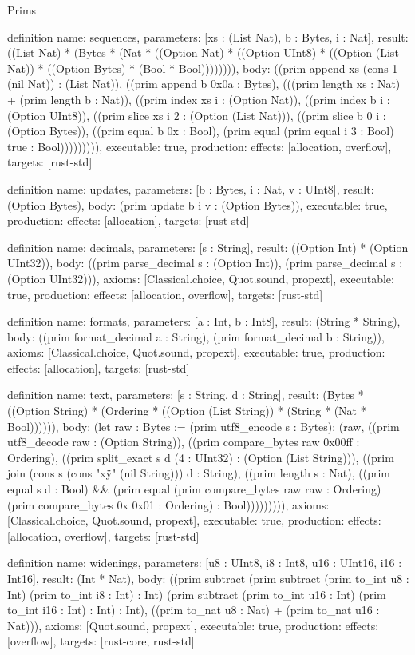 \begin{lexlean}{Prims}
\begin{semanticmodule}
definition{
  name: sequences,
  parameters: [xs : (List Nat), b : Bytes, i : Nat],
  result: ((List Nat) * (Bytes * (Nat * ((Option Nat) * ((Option UInt8) * ((Option (List Nat)) * ((Option Bytes) * (Bool * Bool)))))))),
  body: ((prim append xs (cons 1 (nil Nat)) : (List Nat)), ((prim append b 0x0a : Bytes), (((prim length xs : Nat) + (prim length b : Nat)), ((prim index xs i : (Option Nat)), ((prim index b i : (Option UInt8)), ((prim slice xs i 2 : (Option (List Nat))), ((prim slice b 0 i : (Option Bytes)), ((prim equal b 0x : Bool), (prim equal (prim equal i 3 : Bool) true : Bool))))))))),
  executable: true,
  production: {effects: [allocation, overflow], targets: [rust-std]}
}

definition{
  name: updates,
  parameters: [b : Bytes, i : Nat, v : UInt8],
  result: (Option Bytes),
  body: (prim update b i v : (Option Bytes)),
  executable: true,
  production: {effects: [allocation], targets: [rust-std]}
}

definition{
  name: decimals,
  parameters: [s : String],
  result: ((Option Int) * (Option UInt32)),
  body: ((prim parse_decimal s : (Option Int)), (prim parse_decimal s : (Option UInt32))),
  axioms: [Classical.choice, Quot.sound, propext],
  executable: true,
  production: {effects: [allocation, overflow], targets: [rust-std]}
}

definition{
  name: formats,
  parameters: [a : Int, b : Int8],
  result: (String * String),
  body: ((prim format_decimal a : String), (prim format_decimal b : String)),
  axioms: [Classical.choice, Quot.sound, propext],
  executable: true,
  production: {effects: [allocation], targets: [rust-std]}
}

definition{
  name: text,
  parameters: [s : String, d : String],
  result: (Bytes * ((Option String) * (Ordering * ((Option (List String)) * (String * (Nat * Bool)))))),
  body: (let raw : Bytes := (prim utf8_encode s : Bytes); (raw, ((prim utf8_decode raw : (Option String)), ((prim compare_bytes raw 0x00ff : Ordering), ((prim split_exact s d (4 : UInt32) : (Option (List String))), ((prim join (cons s (cons "x\"y" (nil String))) d : String), ((prim length s : Nat), ((prim equal s d : Bool) && (prim equal (prim compare_bytes raw raw : Ordering) (prim compare_bytes 0x 0x01 : Ordering) : Bool))))))))),
  axioms: [Classical.choice, Quot.sound, propext],
  executable: true,
  production: {effects: [allocation, overflow], targets: [rust-std]}
}

definition{
  name: widenings,
  parameters: [u8 : UInt8, i8 : Int8, u16 : UInt16, i16 : Int16],
  result: (Int * Nat),
  body: ((prim subtract (prim subtract (prim to_int u8 : Int) (prim to_int i8 : Int) : Int) (prim subtract (prim to_int u16 : Int) (prim to_int i16 : Int) : Int) : Int), ((prim to_nat u8 : Nat) + (prim to_nat u16 : Nat))),
  axioms: [Quot.sound, propext],
  executable: true,
  production: {effects: [overflow], targets: [rust-core, rust-std]}
}


\end{semanticmodule}
\end{lexlean}
